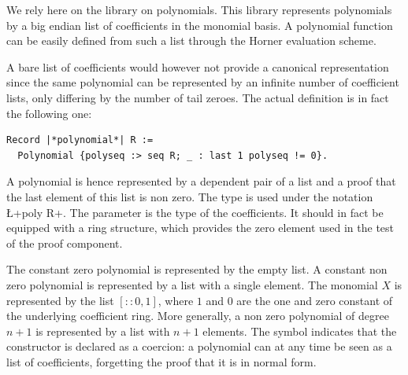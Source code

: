 \documentclass{mscs}
\begin{document}
We rely here on the \ssr{} library on polynomials. This library
represents polynomials by a big endian list of coefficients in
the monomial basis. A polynomial function can be easily defined from
such a list through the Horner evaluation scheme.

A bare list of coefficients would however not
provide a canonical representation since the same
polynomial can be represented by an infinite number of coefficient
lists, only differing by the number of tail zeroes. The actual
definition is in fact the following one:
\begin{lstlisting}
Record |*polynomial*| R :=
  Polynomial {polyseq :> seq R; _ : last 1 polyseq != 0}.
\end{lstlisting}
A polynomial is hence
represented by a dependent pair of a list  and a
proof that the last element of this list is non zero. The type
 is used under the notation \L+{poly R}+. The
parameter  is the type of the coefficients. It should in fact
be equipped with a ring structure, which provides the zero element
used in the test of the proof component.

The constant zero polynomial is represented by the empty list. A
constant non zero polynomial is represented by a list with a single
element. The monomial $X$ is represented
by the list $[:: 0, 1]$, where $1$ and $0$ are the one and zero
constant of the underlying coefficient ring.
More generally, a non zero polynomial of degree $n+1$ is
represented by a list with $n+1$ elements. The \C{:>} symbol indicates
that the  constructor is declared as a coercion: a
polynomial can at any time be seen as a list of coefficients,
forgetting the proof that it is in normal form.
\end{document}
